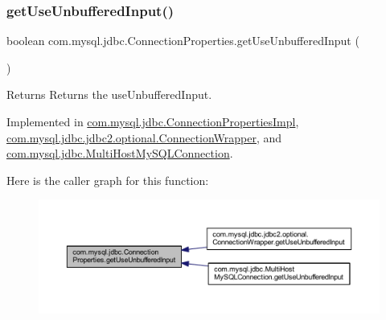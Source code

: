 \subsubsection{\texorpdfstring{get\+Use\+Unbuffered\+Input()}{getUseUnbufferedInput()}}
{\footnotesize\ttfamily boolean com.\+mysql.\+jdbc.\+Connection\+Properties.\+get\+Use\+Unbuffered\+Input (\begin{DoxyParamCaption}{ }\end{DoxyParamCaption})}

\begin{DoxyReturn}{Returns}
Returns the use\+Unbuffered\+Input. 
\end{DoxyReturn}


Implemented in \mbox{\hyperlink{classcom_1_1mysql_1_1jdbc_1_1_connection_properties_impl_adf1142d7968af82cc92cee38ac0b3c5a}{com.\+mysql.\+jdbc.\+Connection\+Properties\+Impl}}, \mbox{\hyperlink{classcom_1_1mysql_1_1jdbc_1_1jdbc2_1_1optional_1_1_connection_wrapper_a3c1db049eb316025a36115fbc35b225f}{com.\+mysql.\+jdbc.\+jdbc2.\+optional.\+Connection\+Wrapper}}, and \mbox{\hyperlink{classcom_1_1mysql_1_1jdbc_1_1_multi_host_my_s_q_l_connection_a4d1dd6152a4a012bf93be333f0e98aba}{com.\+mysql.\+jdbc.\+Multi\+Host\+My\+S\+Q\+L\+Connection}}.

Here is the caller graph for this function\+:\nopagebreak
\begin{figure}[H]
\begin{center}
\leavevmode
\includegraphics[width=350pt]{interfacecom_1_1mysql_1_1jdbc_1_1_connection_properties_a7776bd98c8537739178d1c9a42bd9e8c_icgraph}
\end{center}
\end{figure}
\mbox{\label{interfacecom_1_1mysql_1_1jdbc_1_1_connection_properties_ac3d940436d5babe33067c3f75817e9a9}} 
